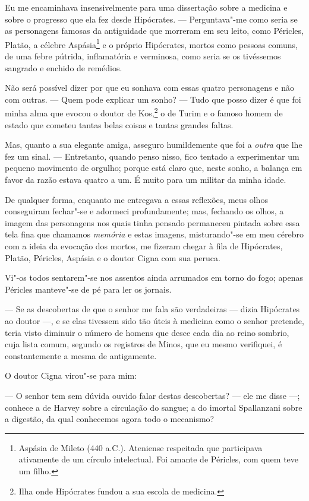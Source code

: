 Eu me encaminhava insensivelmente para uma dissertação sobre a medicina
e sobre o progresso que ela fez desde Hipócrates. --- Perguntava"-me
como seria se as personagens famosas da antiguidade que morreram em seu
leito, como Péricles, Platão, a célebre Aspásia\footnote{ Aspásia de
Mileto (440 a.C.). Ateniense respeitada que participava ativamente de um
círculo intelectual. Foi amante de Péricles, com quem teve um
filho.} e o próprio Hipócrates, mortos como pessoas comuns, de uma
febre pútrida, inflamatória e verminosa, como seria se os tivéssemos
sangrado e enchido de remédios. 

Não será possível dizer por que eu sonhava com essas quatro personagens
e não com outras. --- Quem pode explicar um sonho? --- Tudo que posso
dizer é que foi minha alma que evocou o doutor de Kos,\footnote{ Ilha
onde Hipócrates fundou a sua escola de medicina.} o de Turim e o
famoso homem de estado que cometeu tantas belas coisas e tantas grandes faltas.

Mas, quanto a sua elegante amiga, asseguro humildemente que foi a
\textit{outra} que lhe fez um sinal. --- Entretanto, quando penso
nisso, fico tentado a experimentar um pequeno movimento de orgulho;
porque está claro que, neste sonho, a balança em favor da razão estava
quatro a um. É muito para um militar da minha idade. 

 De qualquer forma, enquanto me entregava a essas reflexões, meus olhos
conseguiram fechar"-se e adormeci profundamente; mas, fechando os olhos,
a imagem das personagens nos quais tinha pensado permaneceu pintada
sobre essa tela fina que chamamos \textit{memória} e estas imagens,
misturando"-se em meu cérebro com a ideia da evocação dos mortos, me
fizeram chegar à fila de Hipócrates, Platão, Péricles, Aspásia e o
doutor Cigna com sua peruca.

 Vi"-os todos sentarem"-se nos assentos ainda arrumados em torno do fogo;
apenas Péricles manteve"-se de pé para ler os jornais. 

 --- Se as descobertas de que o senhor me fala são verdadeiras --- dizia
Hipócrates ao doutor ---, e se elas tivessem sido tão úteis à medicina como
o senhor pretende, teria visto diminuir o número de homens que desce
cada dia ao reino sombrio, cuja lista comum, segundo os registros de
Minos, que eu mesmo verifiquei, é constantemente a mesma de
antigamente. 

 O doutor Cigna virou"-se para mim: 

--- O senhor tem sem dúvida ouvido falar destas descobertas? --- ele me
disse ---; conhece a de Harvey sobre a circulação do sangue; a do imortal
Spallanzani sobre a digestão, da qual conhecemos agora todo o
mecanismo?

